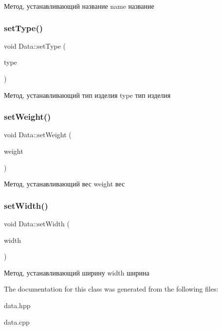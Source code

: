 Метод, устанавливающий название name название \mbox{\label{class_data_a19f337326148f1060cce20ac4d4206fb}} 
\subsubsection{\texorpdfstring{setType()}{setType()}}
{\footnotesize\ttfamily void Data\+::set\+Type (\begin{DoxyParamCaption}\item[{const Q\+String \&}]{type }\end{DoxyParamCaption})}

Метод, устанавливающий тип изделия type тип изделия \mbox{\label{class_data_aff251e538fd90632b197cd3e1de14937}} 
\subsubsection{\texorpdfstring{setWeight()}{setWeight()}}
{\footnotesize\ttfamily void Data\+::set\+Weight (\begin{DoxyParamCaption}\item[{const double}]{weight }\end{DoxyParamCaption})}

Метод, устанавливающий вес weight вес \mbox{\label{class_data_a2ef017807f602292f5d05d9114ee41e5}} 
\subsubsection{\texorpdfstring{setWidth()}{setWidth()}}
{\footnotesize\ttfamily void Data\+::set\+Width (\begin{DoxyParamCaption}\item[{const double}]{width }\end{DoxyParamCaption})}

Метод, устанавливающий ширину width ширина 

The documentation for this class was generated from the following files\+:\begin{DoxyCompactItemize}
\item 
data.\+hpp\item 
data.\+cpp\end{DoxyCompactItemize}
